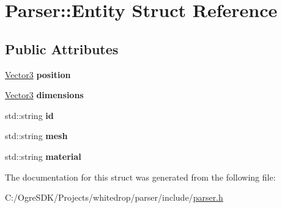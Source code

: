 \hypertarget{struct_parser_1_1_entity}{\section{Parser\+:\+:Entity Struct Reference}
\label{struct_parser_1_1_entity}
}
\subsection*{Public Attributes}
\begin{DoxyCompactItemize}
\item 
\hypertarget{struct_parser_1_1_entity_a02ae26db1b90f57242d35f71adf90383}{\hyperlink{struct_parser_1_1_vector3}{Vector3} {\bfseries position}}\label{struct_parser_1_1_entity_a02ae26db1b90f57242d35f71adf90383}

\item 
\hypertarget{struct_parser_1_1_entity_aa463fbad32edc69a98348d6f4ba8bb45}{\hyperlink{struct_parser_1_1_vector3}{Vector3} {\bfseries dimensions}}\label{struct_parser_1_1_entity_aa463fbad32edc69a98348d6f4ba8bb45}

\item 
\hypertarget{struct_parser_1_1_entity_a8a32deabf7ac75a7cea7b7ef485058cf}{std\+::string {\bfseries id}}\label{struct_parser_1_1_entity_a8a32deabf7ac75a7cea7b7ef485058cf}

\item 
\hypertarget{struct_parser_1_1_entity_abb45487adfa37ddb9d0f4b5f0201fe6b}{std\+::string {\bfseries mesh}}\label{struct_parser_1_1_entity_abb45487adfa37ddb9d0f4b5f0201fe6b}

\item 
\hypertarget{struct_parser_1_1_entity_adf22664f02c66b6054dc91de74f60c36}{std\+::string {\bfseries material}}\label{struct_parser_1_1_entity_adf22664f02c66b6054dc91de74f60c36}

\end{DoxyCompactItemize}


The documentation for this struct was generated from the following file\+:\begin{DoxyCompactItemize}
\item 
C\+:/\+Ogre\+S\+D\+K/\+Projects/whitedrop/parser/include/\hyperlink{parser_8h}{parser.\+h}\end{DoxyCompactItemize}
